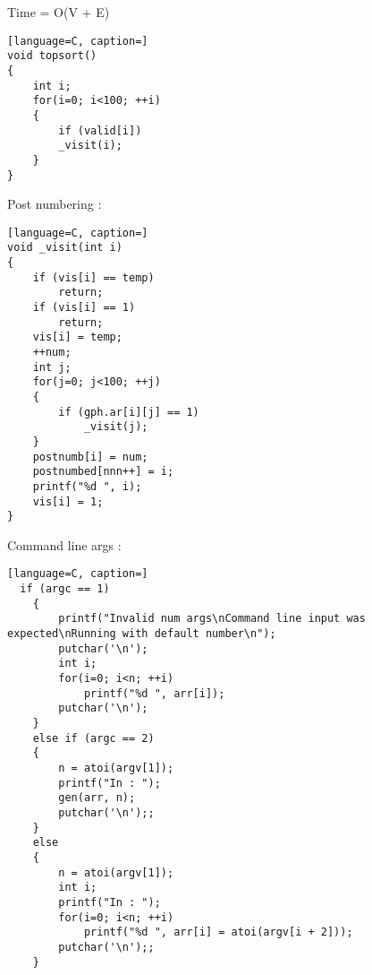 \documentclass{article}
\begin{document}
Time = O(V + E)

\begin{lstlisting}[language=C, caption=]
void topsort()
{
    int i;
    for(i=0; i<100; ++i)
    {
        if (valid[i])
        _visit(i);
    }
}
\end{lstlisting}

Post numbering : \\
\begin{lstlisting}[language=C, caption=]
void _visit(int i)
{
    if (vis[i] == temp)
        return;
    if (vis[i] == 1)
        return;
    vis[i] = temp;
    ++num;
    int j;
    for(j=0; j<100; ++j)
    {
        if (gph.ar[i][j] == 1)
            _visit(j);
    }
    postnumb[i] = num;
    postnumbed[nnn++] = i;
    printf("%d ", i);
    vis[i] = 1;
}
\end{lstlisting}

Command line args :
\begin{lstlisting}[language=C, caption=]
  if (argc == 1)
    {
        printf("Invalid num args\nCommand line input was expected\nRunning with default number\n");
        putchar('\n');
        int i;
        for(i=0; i<n; ++i)
            printf("%d ", arr[i]);
        putchar('\n');
    }
    else if (argc == 2)
    {
        n = atoi(argv[1]);
        printf("In : ");
        gen(arr, n);
        putchar('\n');;
    }
    else
    {
        n = atoi(argv[1]);
        int i;
        printf("In : ");
        for(i=0; i<n; ++i)
            printf("%d ", arr[i] = atoi(argv[i + 2]));
        putchar('\n');;
    }
\end{lstlisting}
\end{document}

